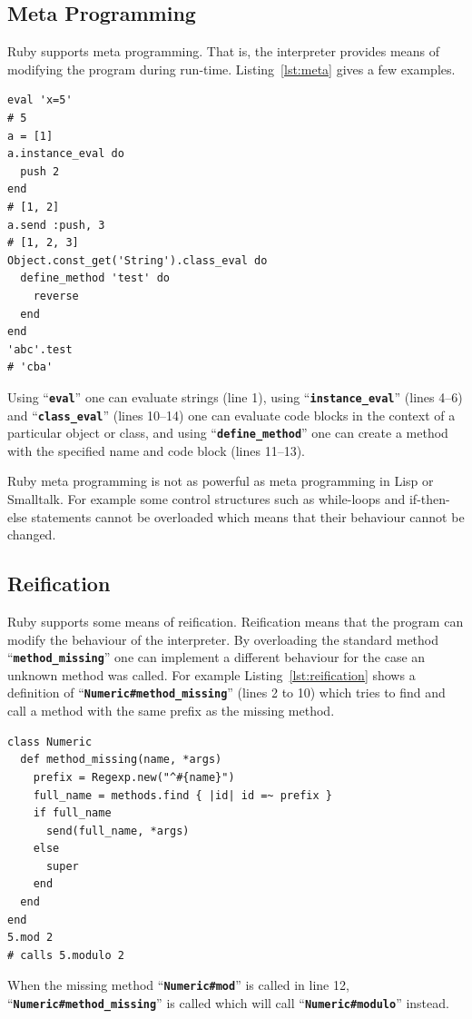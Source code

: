 \documentclass[12pt,a4paper,oneside,openright]{book}
\newcommand{\Eg}{For example }
\newcommand{\Ie}{That is, }
\newcommand{\lst}[1]{Listing~\ref{lst:#1}}
\newcommand{\code}[1]{``\texttt{\textbf{\textcolor{codegray}{\small{#1}}}}''}
\begin{document}
\begin{CJK}{UTF8}{}
\subsection{Meta Programming}\label{cha:metaprog}
Ruby supports meta programming. \Ie the interpreter provides means of modifying the program during run-time. \lst{meta} gives a few examples.
\lstset{language=Ruby,frame=single,numbers=left}
\begin{lstlisting}[float=htbp,caption={Meta programming in Ruby},label=lst:meta]
eval 'x=5'                                 
# 5
a = [1]
a.instance_eval do
  push 2
end                                        
# [1, 2]
a.send :push, 3                            
# [1, 2, 3]
Object.const_get('String').class_eval do
  define_method 'test' do
    reverse
  end
end
'abc'.test                                 
# 'cba'
\end{lstlisting}
Using \code{eval} one can evaluate strings (line 1), using \code{instance\_eval} (lines 4--6) and \code{class\_eval} (lines 10--14) one can evaluate code blocks in the context of a particular object or class, and using \code{define\_method} one can create a method with the specified name and code block (lines 11--13).

Ruby meta programming is not as powerful as meta programming in Lisp or Smalltalk. \Eg some control structures such as while-loops and if-then-else statements cannot be overloaded which means that their behaviour cannot be changed.

\subsection{Reification}
Ruby supports some means of reification. Reification means that the program can modify the behaviour of the interpreter. By overloading the standard method \code{method\_missing} one can implement a different behaviour for the case an unknown method was called. \Eg \lst{reification} shows a definition of \code{Numeric\#method\_missing} (lines 2 to 10) which tries to find and call a method with the same prefix as the missing method.
\lstset{language=Ruby,frame=single,numbers=left}
\begin{lstlisting}[float=htbp,caption={Reification in Ruby},label=lst:reification]
class Numeric
  def method_missing(name, *args)
    prefix = Regexp.new("^#{name}")
    full_name = methods.find { |id| id =~ prefix }
    if full_name
      send(full_name, *args)
    else
      super
    end
  end
end
5.mod 2 
# calls 5.modulo 2
\end{lstlisting}
When the missing method \code{Numeric\#mod} is called in line 12, \code{Numeric\#method\_missing} is called which will call \code{Numeric\#modulo} instead.


\end{CJK}
\end{document}
